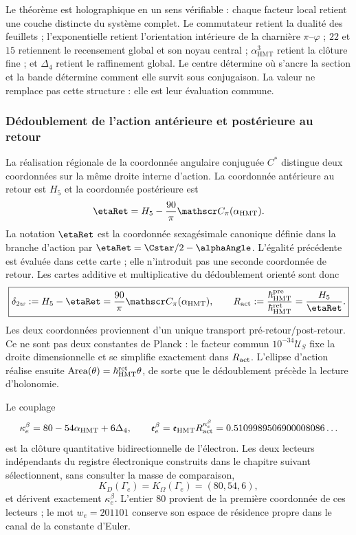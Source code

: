 Le théorème est holographique en un sens vérifiable : chaque facteur local
retient une couche distincte du système complet. Le commutateur retient la
dualité des feuillets ; l'exponentielle retient l'orientation intérieure de la
charnière \(\pi\)--\(\varphi\) ; \(22\) et \(15\) retiennent le recensement global et
son noyau central ; \(\alpha_{\mathrm{HMT}}^3\) retient la clôture fine ; et
\(\Delta_4\) retient le raffinement global. Le centre détermine où
s'ancre la section et la bande détermine comment elle survit sous conjugaison.
La valeur ne remplace pas cette structure : elle est leur évaluation commune.

\subsubsection{Dédoublement de l'action antérieure et postérieure au retour}
\label{p12-83-c15-s2:sec:electron-desdoblamiento-two-way-rev9}

La réalisation régionale de la coordonnée angulaire conjuguée \(C^*\) distingue deux coordonnées sur la
même droite interne d'action. La coordonnée antérieure au retour est \(H_5\) et
la coordonnée postérieure est
\[
\etaRet
 =H_5-\frac{90}{\pi}\mathscr C_\pi(\alpha_{\rm HMT}).
\]
La notation \(\etaRet\) est la coordonnée sexagésimale canonique définie dans la
branche d'action par \(\etaRet=\Cstar/2-\alphaAngle\). L'égalité précédente est
évaluée dans cette carte ; elle n'introduit pas une seconde coordonnée de retour.
Les cartes additive et multiplicative du dédoublement orienté
sont donc
\begin{equation}
 \boxed{
 \delta_{2w}:=H_5-\etaRet
 =\frac{90}{\pi}\mathscr C_\pi(\alpha_{\rm HMT}),
 \qquad
 R_{\rm act}:=\frac{\hbar^{\rm pre}_{\rm HMT}}
 {\hbar^{\rm ret}_{\rm HMT}}
 =\frac{H_5}{\etaRet}.}
 \label{p12-83-c15-s2:eq:electron-desdoblamiento-two-way-rev9}
\end{equation}
Les deux coordonnées proviennent d'un unique transport pré-retour/post-retour.
Ce ne sont pas deux constantes de Planck : le facteur commun
\(10^{-34}\mathcal U_S\) fixe la droite dimensionnelle et se simplifie exactement dans
\(R_{\rm act}\). L'ellipse d'action réalise ensuite
\(\operatorname{Area}(\theta)=\hbar_{\rm HMT}^{\rm ret}\theta\), de sorte que
le dédoublement précède la lecture d'holonomie.

Le couplage
\begin{equation}
 \kappa_e^{\beta}
 =80-54\alpha_{\rm HMT}+6\Delta_4,
 \qquad
 \mathfrak e_e^{\beta}
 =\mathfrak e_{\rm HMT}R_{\rm act}^{\kappa_e^{\beta}}
 =0.5109989506900008086\ldots
 \label{p12-83-c15-s2:eq:electron-beta-two-way-rev9}
\end{equation}
est la clôture quantitative bidirectionnelle de l'électron. Les deux lecteurs
indépendants du registre électronique construits dans le chapitre suivant
sélectionnent, sans consulter la masse de comparaison,
\[
 K_D(\Gamma_e)=K_\Omega(\Gamma_e)=(80,54,6),
\]
et dérivent exactement \(\kappa_e^\beta\). L'entier \(80\) provient de la
première coordonnée de ces lecteurs ; le mot \(w_e=201101\) conserve son
espace de résidence propre dans le canal de la constante d'Euler.

